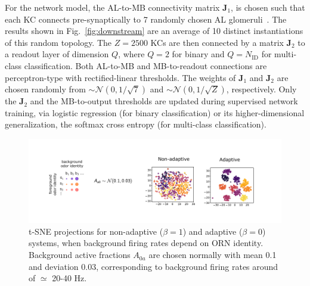 \documentclass[10pt,prl,aps,showpacs,twocolumn,unsortedaddress,showkeys,linenumbers]{revtex4-1}
\begin{document}
For the network model, the AL-to-MB connectivity matrix $\mathbf {J}_1$, is chosen such that  each KC connects pre-synaptically to 7 randomly chosen AL glomeruli~\cite{litwinkumar,abbott_axel}. The results shown in Fig.~\ref{fig:downstream} are an average of 10 distinct instantiations of this random topology. The $Z=2500$ KCs are then connected by a matrix $\mathbf J_2$ to a readout layer of dimension $Q$, where $Q=2$ for binary and $Q=N_{\text{ID}}$ for multi-class classification. Both AL-to-MB and MB-to-readout connections are perceptron-type with rectified-linear thresholds. The weights of $\mathbf J_1$ and $\mathbf J_2$ are chosen randomly from $\sim \mathcal{N}(0, 1/\sqrt{7})$ and $\sim \mathcal{N}(0, 1/\sqrt{Z})$, respectively. Only the $\mathbf J_2$ and the MB-to-output thresholds are updated during supervised network training, via logistic regression (for binary classification) or its higher-dimensional generalization, the softmax cross entropy (for multi-class classification).













\onecolumngrid

\pagebreak


\renewcommand\thefigure{\ref{fig:coding}--figure supplement 1}  



\begin{figure}
\centering
\includegraphics[width=\linewidth]{figures/2_coding_representation_SI}
\caption{
{\color{blue}
t-SNE projections for non-adaptive ($\beta = 1$) and adaptive ($\beta = 0$) systems, when background firing rates depend on ORN identity. Background active fractions $A_{0a}$ are chosen normally with mean 0.1 and deviation 0.03, corresponding to background firing rates around of $\simeq$ 20-40 Hz. 
}
}
\label{fig:SI_coding}
\end{figure}
\end{document}
